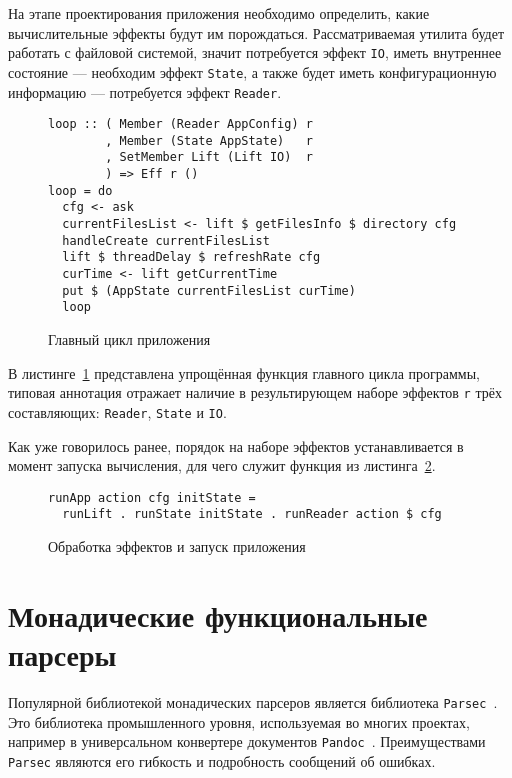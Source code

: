 На этапе проектирования приложения необходимо определить, какие вычислительные
эффекты будут им порождаться. Рассматриваемая утилита будет работать с файловой
системой, значит потребуется эффект \lstinline{IO}, иметь внутреннее
состояние --- необходим эффект \lstinline{State}, а также будет иметь
конфигурационную информацию --- потребуется эффект \lstinline{Reader}.

\begin{figure}[t]
\begin{lstlisting}
loop :: ( Member (Reader AppConfig) r
        , Member (State AppState)   r
        , SetMember Lift (Lift IO)  r
        ) => Eff r ()
loop = do
  cfg <- ask
  currentFilesList <- lift $ getFilesInfo $ directory cfg
  handleCreate currentFilesList
  lift $ threadDelay $ refreshRate cfg
  curTime <- lift getCurrentTime
  put $ (AppState currentFilesList curTime)
  loop
\end{lstlisting}
\caption{Главный цикл приложения}
\label{listing:ftMainLoop}
\end{figure}

В листинге~\ref{listing:ftMainLoop} представлена упрощённая функция главного
цикла программы, типовая аннотация отражает наличие в результирующем наборе
эффектов \lstinline{r} трёх составляющих: \lstinline{Reader}, \lstinline{State}
и \lstinline{IO}.

Как уже говорилось ранее, порядок на наборе эффектов устанавливается в момент
запуска вычисления, для чего служит функция из листинга~\ref{listing:ftRun}.

\begin{figure}[t]
\begin{lstlisting}
runApp action cfg initState =
  runLift . runState initState . runReader action $ cfg
\end{lstlisting}
\caption{Обработка эффектов и запуск приложения}
\label{listing:ftRun}
\end{figure}

\section{Монадические функциональные парсеры}

Популярной библиотекой монадических парсеров является библиотека
\lstinline{Parsec}~\cite{parsec}. Это библиотека промышленного уровня,
используемая во многих проектах, например в универсальном конвертере документов
\lstinline{Pandoc}~\cite{pandoc}. Преимуществами \lstinline{Parsec} являются
 его гибкость и подробность сообщений об ошибках.


